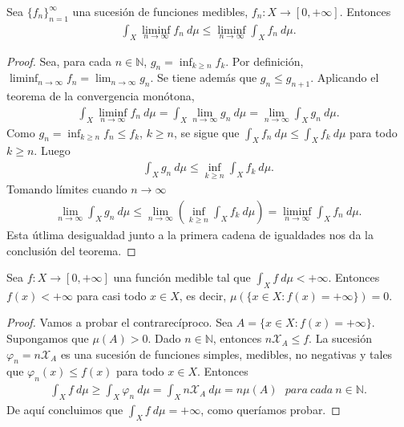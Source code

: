\begin{teo}
    Sea $\{f_n\}_{n=1}^{\infty}$ una sucesión de funciones medibles, $f_n: X \longrightarrow [0,+\infty]$. Entonces
    \begin{align*}
        \int_{X}{\liminf_{n \to \infty}{f_n} \ d\mu} \leq \liminf_{n \to \infty}{\int_{X}{f_n \ d\mu}}.
    \end{align*}
\end{teo}

\begin{proof}
    Sea, para cada $n \in \mathbb{N}$, $g_n = \inf_{k \ge n}{f_k}$. Por definición, $\liminf_{n \to \infty}{f_n} = \lim_{n \to \infty}{g_n}$. Se tiene además que $g_n \leq g_{n+1}$. Aplicando el teorema de la convergencia monótona,
    \begin{align*}
        \int_{X}{\liminf_{n \to \infty}{f_n \ d\mu}} = \int_{X}{\lim_{n \to \infty}{g_n \ d\mu}} = \lim_{n \to \infty}{\int_{X}{g_n \ d\mu}}.
    \end{align*}
    Como $g_n = \inf_{k \ge n}{f_n} \leq f_k$, $k \ge n$, se sigue que $\int_{X}{f_n \ d\mu} \leq \int_{X}{f_k \ d\mu}$ para todo $k \ge n$. Luego
    \begin{align*}
        \int_{X}{g_n \ d\mu} \leq \inf_{k \ge n}{\int_{X}{f_k \ d\mu}}.
    \end{align*}
    Tomando límites cuando $n \to \infty$
    \begin{align*}
        \lim_{n \to \infty}{\int_{X}{g_n \ d\mu}} \leq \lim_{n \to \infty}{\left( \inf_{k \ge n}{\int_{X}{f_k \ d\mu}} \right)} = \liminf_{n \to \infty}{\int_{X}{f_n \ d\mu}}.
    \end{align*}
    Esta útlima desigualdad junto a la primera cadena de igualdades nos da la conclusión del teorema.
\end{proof}

\begin{prop}
    Sea $f: X \longrightarrow [0,+\infty]$ una función medible tal que $\int_{X}{f \ d\mu} < +\infty$. Entonces $f(x) < +\infty$ para casi todo $x \in X$, es decir, $\mu(\{ x \in X : f(x) = +\infty\}) = 0$.
\end{prop}

\begin{proof}
    Vamos a probar el contrarecíproco. Sea $A = \{ x \in X : f(x) = +\infty\}$. Supongamos que $\mu(A) > 0$. Dado $n \in \mathbb{N}$, entonces $n \mathcal{X}_A \leq f$. La sucesión $\varphi_n = n \mathcal{X}_A$ es una sucesión de funciones simples, medibles, no negativas y tales que $\varphi_n(x) \leq f(x)$ para todo $x \in X$. Entonces
    \begin{align*}
        \int_{X}{f \ d\mu} \ge \int_{X}{\varphi_n \ d\mu} = \int_{X}{n \mathcal{X}_A \ d\mu} = n\mu(A) \ \ \ para \ cada \ n \in \mathbb{N}.
    \end{align*}
    De aquí concluimos que $\int_{X}{f \ d\mu} = +\infty$, como queríamos probar.
\end{proof}

